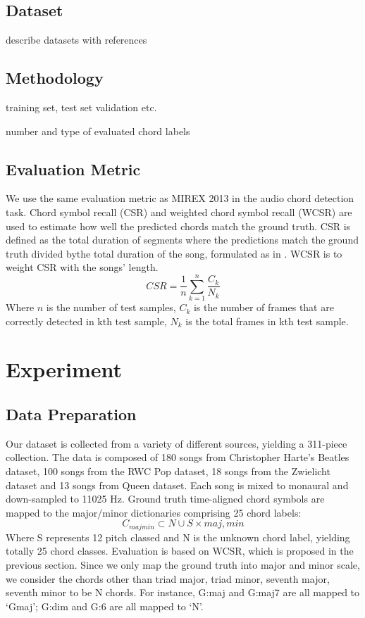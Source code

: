 \documentclass{article}
\begin{document}
\subsection{Dataset}
describe datasets with references
\subsection{Methodology}
training set, test set validation etc.

number and type of evaluated chord labels
\subsection{Evaluation Metric}
We use the same evaluation metric as MIREX 2013 in the audio chord detection task. Chord symbol recall (CSR) and weighted chord symbol recall (WCSR) are used to estimate how well the predicted chords match the ground truth. CSR is defined as the total duration of segments where the predictions match the ground truth divided bythe total duration of the song, formulated as in . WCSR is to weight CSR with the songs' length.  
\begin{equation}\label{csr}
CSR = \frac{1}{n} \sum_{k=1}^n \frac{C_{k}}{N_{k}}
\end{equation}
Where $n$ is the number of test samples, $C_{k}$ is the number of frames that are correctly detected in kth test sample, $N_{k}$ is the total frames in kth test sample. 

\section{Experiment}
\subsection{Data Preparation}
Our dataset is collected from a variety of different sources, yielding a 311-piece collection. The data is composed of 180 songs from Christopher Harte's Beatles dataset, 100 songs from the RWC Pop dataset, 18 songs from the Zwielicht dataset and 13 songs from Queen dataset. Each song is mixed to monaural and down-sampled to 11025 Hz. Ground truth time-aligned chord symbols are mapped to the major/minor dictionaries comprising 25 chord labels:
\begin{equation}
C_{majmin} \subset {N} \cup S \times {maj,min}
\end{equation}
Where S represents 12 pitch classed and N is the unknown chord label, yielding totally 25 chord classes. Evaluation is based on WCSR, which is proposed in the previous section. Since we only map the ground truth into major and minor scale, we consider the chords other than triad major, triad minor, seventh major, seventh minor to be N chords. For instance, G:maj and G:maj7 are all mapped to `Gmaj'; G:dim and G:6 are all mapped to `N'. 
\end{document}
